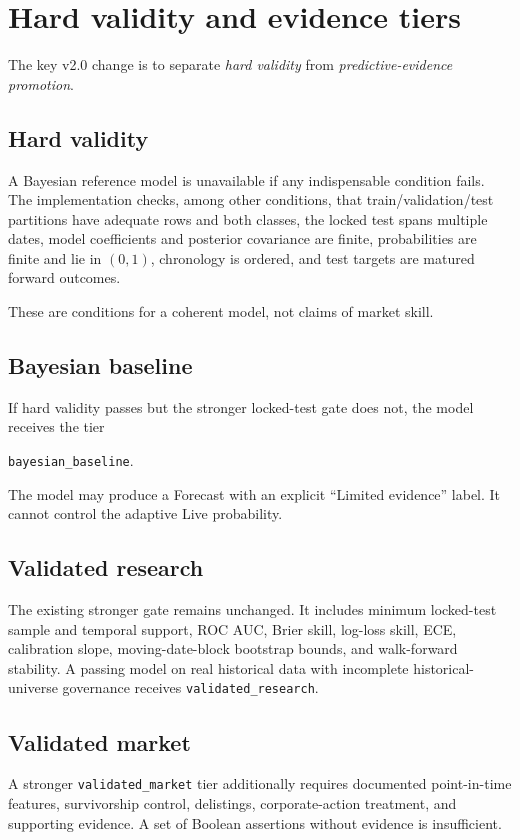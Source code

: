 \documentclass[11pt]{article}
\begin{document}
\section{Hard validity and evidence tiers}
The key v2.0 change is to separate \emph{hard validity} from \emph{predictive-evidence promotion}.

\subsection{Hard validity}
A Bayesian reference model is unavailable if any indispensable condition fails. The implementation checks, among other conditions, that train/validation/test partitions have adequate rows and both classes, the locked test spans multiple dates, model coefficients and posterior covariance are finite, probabilities are finite and lie in $(0,1)$, chronology is ordered, and test targets are matured forward outcomes.

These are conditions for a coherent model, not claims of market skill.

\subsection{Bayesian baseline}
If hard validity passes but the stronger locked-test gate does not, the model receives the tier
\begin{center}
\texttt{bayesian\_baseline}.
\end{center}
The model may produce a Forecast with an explicit ``Limited evidence'' label. It cannot control the adaptive Live probability.

\subsection{Validated research}
The existing stronger gate remains unchanged. It includes minimum locked-test sample and temporal support, ROC AUC, Brier skill, log-loss skill, ECE, calibration slope, moving-date-block bootstrap bounds, and walk-forward stability. A passing model on real historical data with incomplete historical-universe governance receives \texttt{validated\_research}.

\subsection{Validated market}
A stronger \texttt{validated\_market} tier additionally requires documented point-in-time features, survivorship control, delistings, corporate-action treatment, and supporting evidence. A set of Boolean assertions without evidence is insufficient.
\end{document}
